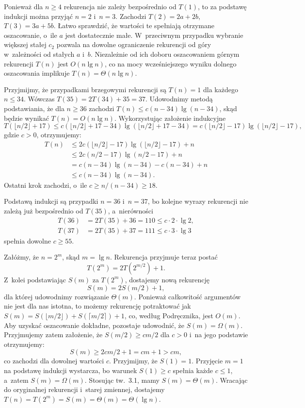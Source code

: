 Ponieważ dla $n\ge4$ rekurencja nie zależy bezpośrednio od $T(1)$, to za podstawę indukcji można przyjąć $n=2$ i~$n=3$.
Zachodzi $T(2)=2a+2b$, $T(3)=3a+5b$.
Łatwo sprawdzić, że wartości te spełniają otrzymane oszacowanie, o~ile $a$ jest dostatecznie małe.
W~przeciwnym przypadku wybranie większej stałej $c_2$ pozwala na dowolne ograniczenie rekurencji od góry w~zależności od stałych $a$ i~$b$.
Niezależnie od ich doboru oszacowaniem górnym rekurencji $T(n)$ jest $O(n\lg n)$, co na mocy wcześniejszego wyniku dolnego oszacowania implikuje $T(n)=\Theta(n\lg n)$.

\exercise %
Przyjmijmy, że przypadkami brzegowymi rekurencji są $T(n)=1$ dla każdego $n\le34$.
Wówczas $T(35)=2T(34)+35=37$.
Udowodnimy metodą podstawiania, że dla $n\ge36$ zachodzi $T(n)\le c(n-34)\lg(n-34)$, skąd będzie wynikać $T(n)=O(n\lg n)$.
Wykorzystując założenie indukcyjne
\[
	T(\lfloor n/2\rfloor+17) \le c(\lfloor n/2\rfloor+17-34)\lg(\lfloor n/2\rfloor+17-34) = c(\lfloor n/2\rfloor-17)\lg(\lfloor n/2\rfloor-17),
\]
gdzie $c>0$, otrzymujemy:
\begin{align*}
	T(n) &\le 2c(\lfloor n/2\rfloor-17)\lg(\lfloor n/2\rfloor-17)+n \\
	&\le 2c(n/2-17)\lg(n/2-17)+n \\
	&= c(n-34)\lg(n-34)-c(n-34)+n \\
	&\le c(n-34)\lg(n-34).
\end{align*}
Ostatni krok zachodzi, o~ile $c\ge n/(n-34)\ge18$.

Podstawą indukcji są przypadki $n=36$ i~$n=37$, bo kolejne wyrazy rekurencji nie zależą już bezpośrednio od $T(35)$, a~nierówności
\begin{align*}
	T(36) &= 2T(35)+36 = 110 \le c\cdot2\cdot\lg2, \\
	T(37) &= 2T(35)+37 = 111 \le c\cdot3\cdot\lg3
\end{align*}
spełnia dowolne $c\ge55$.

\exercise %
Załóżmy, że $n=2^m$, skąd $m=\lg n$.
Rekurencja przyjmuje teraz postać
\[
	T(2^m) = 2T(2^{m/2})+1.
\]
Z~kolei podstawiając $S(m)$ za $T(2^m)$, dostajemy nową rekurencję
\[
	S(m) = 2S(m/2)+1,
\]
dla której udowodnimy rozwiązanie $\Theta(m)$.
Ponieważ całkowitość argumentów nie jest dla nas istotna, to możemy rekurencję potraktować jak $S(m)=S(\lfloor m/2\rfloor)+S(\lceil m/2\rceil)+1$, co, według Podręcznika, jest $O(m)$.
Aby uzyskać oszacowanie dokładne, pozostaje udowodnić, że $S(m)=\Omega(m)$.
Przyjmujemy zatem założenie, że $S(m/2)\ge cm/2$ dla $c>0$ i~na jego podstawie otrzymujemy:
\[
	S(m) \ge 2cm/2+1 = cm+1 > cm,
\]
co zachodzi dla dowolnej wartości $c$.
Przyjmijmy, że $S(1)=1$.
Przyjęcie $m=1$ na podstawę indukcji wystarcza, bo warunek $S(1)\ge c$ spełnia każde $c\le1$, a~zatem $S(m)=\Omega(m)$.
Stosując tw.\ 3.1, mamy $S(m)=\Theta(m)$.
Wracając do oryginalnej rekurencji i~starej zmiennej, dostajemy $T(n)=T(2^m)=S(m)=\Theta(m)=\Theta(\lg n)$.
